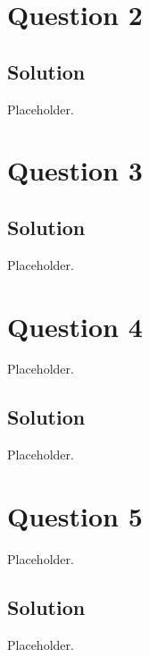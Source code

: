 \documentclass[a4paper, 10pt]{article}
\begin{document}
  \section{Question 2}
    \subsection{Solution}
      Placeholder.


  \section{Question 3}
    \subsection{Solution}
      Placeholder.


  \section{Question 4}
    Placeholder.
    \subsection{Solution}
      Placeholder.


  \section{Question 5}
    Placeholder.
    \subsection{Solution}
      Placeholder.

\end{document}
